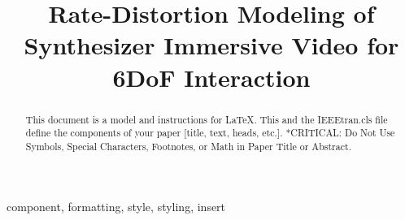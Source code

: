 \documentclass[conference]{IEEEtran}
\begin{document}
\title{Rate-Distortion Modeling of Synthesizer Immersive Video for 6DoF Interaction}

\author{
}

\maketitle

\begin{abstract}
This document is a model and instructions for \LaTeX.
This and the IEEEtran.cls file define the components of your paper [title, text, heads, etc.]. *CRITICAL: Do Not Use Symbols, Special Characters, Footnotes, 
or Math in Paper Title or Abstract.
\end{abstract}

\begin{IEEEkeywords}
component, formatting, style, styling, insert
\end{IEEEkeywords}









\end{document}
